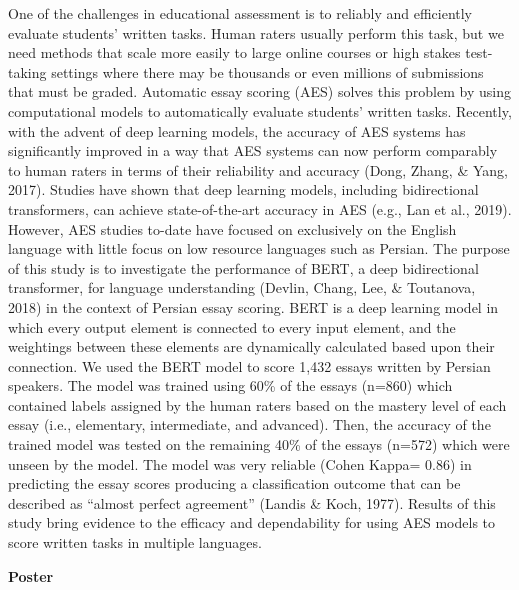 \documentclass[
]{book}
\begin{document}
One of the challenges in educational assessment is to reliably and efficiently evaluate students' written tasks. Human raters usually perform this task, but we need methods that scale more easily to large online courses or high stakes test-taking settings where there may be thousands or even millions of submissions that must be graded. Automatic essay scoring (AES) solves this problem by using computational models to automatically evaluate students' written tasks. Recently, with the advent of deep learning models, the accuracy of AES systems has significantly improved in a way that AES systems can now perform comparably to human raters in terms of their reliability and accuracy (Dong, Zhang, \& Yang, 2017). Studies have shown that deep learning models, including bidirectional transformers, can achieve state-of-the-art accuracy in AES (e.g., Lan et al., 2019). However, AES studies to-date have focused on exclusively on the English language with little focus on low resource languages such as Persian. The purpose of this study is to investigate the performance of BERT, a deep bidirectional transformer, for language understanding (Devlin, Chang, Lee, \& Toutanova, 2018) in the context of Persian essay scoring. BERT is a deep learning model in which every output element is connected to every input element, and the weightings between these elements are dynamically calculated based upon their connection. We used the BERT model to score 1,432 essays written by Persian speakers. The model was trained using 60\% of the essays (n=860) which contained labels assigned by the human raters based on the mastery level of each essay (i.e., elementary, intermediate, and advanced). Then, the accuracy of the trained model was tested on the remaining 40\% of the essays (n=572) which were unseen by the model. The model was very reliable (Cohen Kappa= 0.86) in predicting the essay scores producing a classification outcome that can be described as ``almost perfect agreement'' (Landis \& Koch, 1977). Results of this study bring evidence to the efficacy and dependability for using AES models to score written tasks in multiple languages.

\textbf{Poster}
\end{document}
